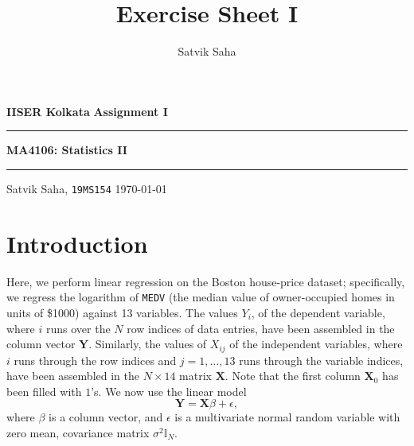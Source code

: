 \documentclass[10pt]{article}
\title{Exercise Sheet I}
\author{Satvik Saha}
\date{}
\renewcommand{\vec}{\bm}
\begin{document}
    \noindent\textbf{IISER Kolkata} \hfill \textbf{Assignment I}
    \vspace{3pt}
    \hrule
    \vspace{3pt}
    \begin{center}
    \LARGE{\textbf{MA4106: Statistics II}}
    \end{center}
    \vspace{3pt}
    \hrule
    \vspace{3pt}
    Satvik Saha, \texttt{19MS154} \hfill \today
    \vspace{20pt}

    \setlength{\parskip}{1em}


    \section{Introduction}

    Here, we perform linear regression on the Boston house-price dataset;
    specifically, we regress the logarithm of \texttt{MEDV} (the median value of
    owner-occupied homes in units of \$1000) against 13 variables. The values $Y_i$,
    of the dependent variable, where $i$ runs over the $N$ row indices of data
    entries, have been assembled in the column vector $\vec{Y}$. Similarly, the
    values of $X_{ij}$ of the independent variables, where $i$ runs through the row
    indices and $j = 1, \dots, 13$ runs through the variable indices, have been
    assembled in the $N\times 14$ matrix $\vec{X}$. Note that the first column
    $\vec{X}_0$ has been filled with $1$'s. We now use the linear model \[
        \vec{Y} = \vec{X}\beta + \epsilon,
    \] where $\beta$ is a column vector, and $\epsilon$ is a multivariate normal
    random variable with zero mean, covariance matrix $\sigma^2\mathbb{I}_N$.
\end{document}
